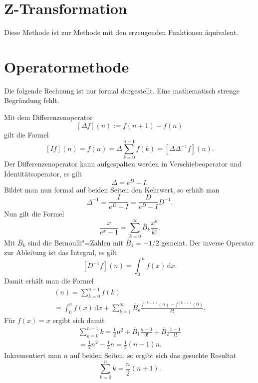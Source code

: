 \documentclass[a4paper,10pt,fleqn,twocolumn,twoside]{article}
\begin{document}
\section{Z-Transformation}

Diese Methode ist zur Methode mit den erzeugenden
Funktionen äquivalent.

\section{Operatormethode}

Die folgende Rechnung ist nur formal dargestellt. Eine
mathematisch strenge Begründung fehlt.

Mit dem Differenzenoperator
\[[\Delta f](n) := f(n+1)-f(n)\]
gilt die Formel
\[[If](n) = f(n) = \Delta\sum_{k=0}^{n-1}f(k)
= [\Delta\Delta^{-1}f](n).\]
Der Differenzenoperator kann aufgespalten werden in
Verschiebeoperator und Identitätsoperator, es gilt
\[\Delta = e^D-I.\]
Bildet man nun formal auf beiden Seiten den Kehrwert, so erhält
man
\[\Delta^{-1} = \frac{I}{e^D-I} = \frac{D}{e^D-I}D^{-1}.\]
Nun gilt die Formel
\[\frac{x}{e^x-1} = \sum_{k=0}^\infty \overline{B}_k \frac{x^k}{k!}.\]
Mit \(\overline{B}_k\) sind die Bernoulli"=Zahlen mit
\(\overline{B}_1=-1/2\) gemeint.
Der inverse Operator zur Ableitung ist das Integral, es gilt
\[[D^{-1}f](n) = \int_0^n f(x)\,\mathrm dx.\]
Damit erhält man die Formel
\begin{gather*}
[\Delta^{-1} f](n) = \sum_{k=0}^{n-1} f(k)\\
= \int_0^n f(x)\,\mathrm dx
+ \sum_{k=1}^\infty \overline{B}_k
\frac{f^{(k-1)}(n)-f^{(k-1)}(0)}{k!}.
\end{gather*}
Für \(f(x)=x\) ergibt sich damit
\begin{gather*}
\sum_{k=0}^{n-1}k
= \frac{1}{2}n^2+\overline{B}_1 \frac{n-0}{0!}
+\overline{B}_2 \frac{1-1}{1!}\\
= \frac{1}{2}n^2-\frac{1}{2}n
= \frac{1}{2}(n-1)n.
\end{gather*}
Inkrementiert man \(n\) auf beiden Seiten, so ergibt sich das
gesuchte Resultat
\[\sum_{k=0}^n k = \frac{n}{2}(n+1).\]
\end{document}
